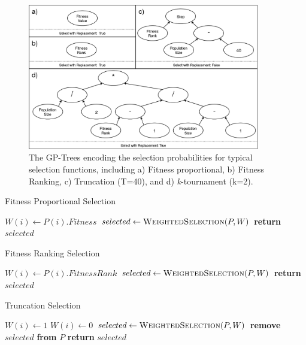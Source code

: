 \documentclass[sigconf]{acmart}
\begin{document}
\begin{figure}
    \centering
    \includegraphics[width=0.9\textwidth]{example_selections}
    \caption{The GP-Trees encoding the selection probabilities for typical selection functions, including a) Fitness proportional, b) Fitness Ranking, c) Truncation (T=40), and d) \textit{k}-tournament (k=2).}
    \label{fig:example_selections}
\end{figure}

\begin{algorithm}
\caption{Fitness Proportional Selection}
\label{alg:FitnessProportionalSelection}
\begin{algorithmic}[1]
		\State $W(i) \leftarrow P(i).Fitness$
	\EndFor
	\State $selected \leftarrow \Call{WeightedSelection}{P, W}$	
	\State \textbf{return} $selected$
\EndProcedure

\end{algorithmic}
\end{algorithm}

\begin{algorithm}
\caption{Fitness Ranking Selection}
\label{alg:FitnessRankingSelection}
\begin{algorithmic}[1]
		\State $W(i) \leftarrow P(i).FitnessRank$
	\EndFor
	\State $selected \leftarrow \Call{WeightedSelection}{P, W}$	
	\State \textbf{return} $selected$
\EndProcedure
\end{algorithmic}
\end{algorithm}

\begin{algorithm}
\caption{Truncation Selection}
\label{alg:TruncationSelection}
\begin{algorithmic}[1]
			\State $W(i) \leftarrow 1$
		\Else
			\State $W(i) \leftarrow 0$
		\EndIf
	\EndFor
	\State $selected \leftarrow \Call{WeightedSelection}{P, W}$
	\State \textbf{remove} $selected$ \textbf{from} $P$	
	\State \textbf{return} $selected$
\EndProcedure
\end{algorithmic}
\end{algorithm}
\end{document}
